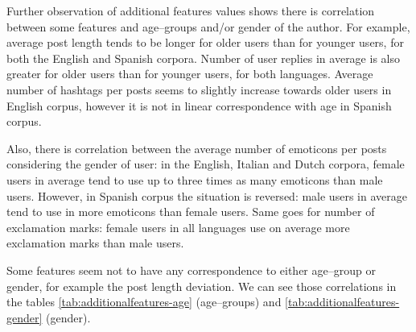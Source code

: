 \documentclass[10pt, a4paper]{article}
\begin{document}
Further observation of additional features values shows there is correlation between some features and age--groups and/or gender of the author.
For example, average post length tends to be longer for older users than for younger users, for both the English and Spanish corpora.
Number of user replies in average is also greater for older users than for younger users, for both languages.
Average number of hashtags per posts seems to slightly increase towards older users in English corpus, however it is not in linear correspondence with age in Spanish corpus.

Also, there is correlation between the average number of emoticons per posts considering the gender of user: in the English, Italian and Dutch corpora, female users in average tend to use up to three times as many emoticons than male users.
However, in Spanish corpus the situation is reversed: male users in average tend to use in more emoticons than female users.
Same goes for number of exclamation marks: female users in all languages use on average more exclamation marks than male users.

Some features seem not to have any correspondence to either age--group or gender, for example the post length deviation.
We can see those correlations in the tables \ref{tab:additionalfeatures-age} (age--groups) and \ref{tab:additionalfeatures-gender} (gender).
\end{document}
